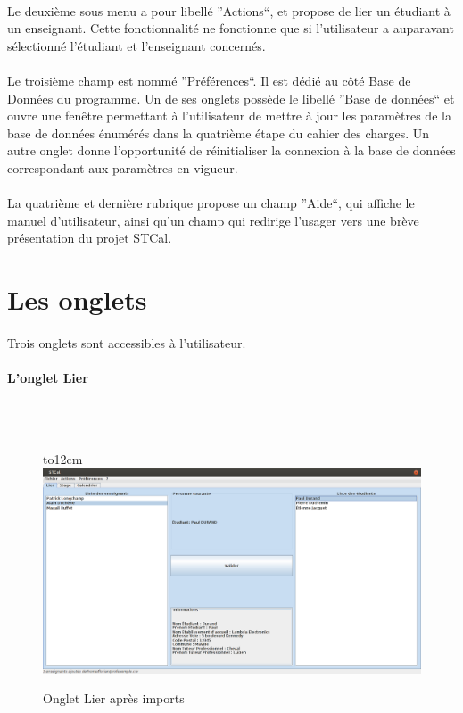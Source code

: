 \documentclass[a4paper,10pt]{report}
\begin{document}
	  \paragraph{}
	    Le deuxième sous menu a pour libellé ''Actions``, et propose de lier un étudiant à un enseignant. 
	    Cette fonctionnalité ne fonctionne que si l'utilisateur a auparavant sélectionné l'étudiant et l'enseignant concernés.
	  \paragraph{}
	    Le troisième champ est nommé ''Préférences``.
	    Il est dédié au côté Base de Données du programme.
	    Un de ses onglets possède le libellé ''Base de données`` et ouvre une fenêtre permettant à l'utilisateur de mettre à jour les paramètres de la base de données énumérés dans la quatrième étape du cahier des charges. 
	    Un autre onglet donne l'opportunité de réinitialiser la connexion à la base de données correspondant aux paramètres en vigueur.
	  \paragraph{}
	    La quatrième et dernière rubrique propose un champ ''Aide``, qui affiche le manuel d'utilisateur, ainsi qu'un champ qui redirige l'usager vers une brève présentation du projet STCal. 
      
        \section{Les onglets}
	  
	  \paragraph{}
	    Trois onglets sont accessibles à l'utilisateur.
	  
	  \paragraph{L'onglet Lier}
	  ~\\~\\
	  
	    \begin{figure}[!h]
	  
	    \hbox to12cm{\hss\includegraphics[width=16cm]{Lier.png}\hss}
	    \caption{Onglet Lier après imports}
	    \end{figure}
\end{document}
